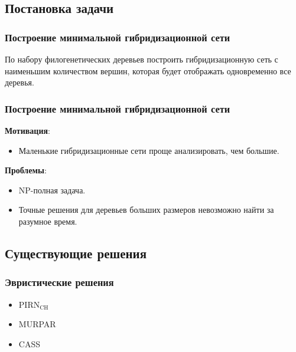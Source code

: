 \documentclass[hyperref={unicode}]{beamer}
\begin{document}
\subsection{Постановка задачи}

\begin{frame}
\frametitle{Построение минимальной гибридизационной сети}

По набору филогенетических деревьев построить гибридизационную сеть с наименьшим количеством вершин, которая будет отображать одновременно все деревья.

\end{frame}

%
%

\begin{frame}
\frametitle{Построение минимальной гибридизационной сети}

\textbf{Мотивация}: 
\begin{itemize}
	\item Маленькие гибридизационные сети проще анализировать, чем большие.
\end{itemize}


\textbf{Проблемы}:
\begin{itemize}
	\item NP-полная задача.
	\item Точные решения для деревьев больших размеров невозможно найти за разумное время.
\end{itemize}

\end{frame}

\subsection{Существующие решения}

\begin{frame}
\frametitle{Эвристические решения}

\begin{itemize}
	\item $\mathrm{PIRN_{CH}}$
	\item MURPAR
	\item CASS
\end{itemize}

\end{frame}
\end{document}
